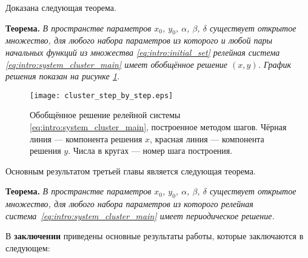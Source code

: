 Доказана следующая теорема.

\bigskip

\textbf{Теорема.}
\textit{В пространстве параметров $x_0$, $y_0$, $\alpha$, $\beta$, $\delta$ существует открытое множество, для любого набора параметров из которого и любой пары начальных функций из множества \eqref{eq:intro:initial_set} релейная система \eqref{eq:intro:system_cluster_main} имеет обобщённое решение $(x, y)$. График решения показан на рисунке \ref{fig:intro:cluster_step_by_step}.}

\begin{figure}[!ht]
	\centering
	\texttt{[image: cluster\_step\_by\_step.eps]}
	\caption{Обобщённое решение релейной системы \eqref{eq:intro:system_cluster_main}, построенное методом шагов. Чёрная линия --- компонента решения $x$, красная линия --- компонента решения $y$. Числа в кругах --- номер шага построения.}
	\label{fig:intro:cluster_step_by_step}
\end{figure}

Основным результатом третьей главы является следующая теорема.

\textbf{Теорема.} \textit{В пространстве параметров $x_0$, $y_0$, $\alpha$, $\beta$, $\delta$ существует открытое множество, для любого набора параметров из которого релейная система~\eqref{eq:intro:system_cluster_main} имеет периодическое решение.}

\FloatBarrier
{}                                  %
В \textbf{заключении} приведены основные результаты работы, которые заключаются в следующем:



